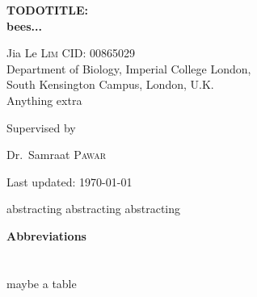 \documentclass[12pt]{article}
\renewenvironment{abstract}
 {\hspace{.8cm}
  {\bfseries\huge\abstractname}
  \list{}{
    \setlength{\leftmargin}{.95cm}%
    \setlength{\rightmargin}{\leftmargin}%
  }%
  \item\relax}
 {\endlist}
\begin{document}
\begin{titlepage}
	\centering
	\vspace*{\fill}
	{\huge\bfseries TODOTITLE: \\ bees...\par}
	\vspace{2cm}
	{\Large Jia Le \textsc{Lim} {    }  CID: 00865029}
	\\ 	\vspace{0.5cm}
	{Department of Biology, Imperial College London, \\South Kensington Campus, London, U.K.} \\ \vspace{0.5cm}
	{Anything extra} \\
	\vspace*{\fill}
	{\large Supervised by\par
	Dr.~Samraat \textsc{Pawar}}
	\vfill
	{\large Last updated: \today\par}
\end{titlepage}



\newpage
{}
\vspace*{\fill}
\begin{abstract}  
\doublespacing
abstracting abstracting abstracting

\end{abstract}
\vfill

\newpage
{}
\vspace*{\fill}
\tableofcontents 
\vspace*{\fill} 
\thispagestyle{empty}

\doublespacing

\newpage 
\vspace*{\fill}
{\huge\bfseries Abbreviations} \\
\\
\\
\large{maybe a table}
\vfill

\newpage
\pagestyle{fancy}
\fancyhf{}
\renewcommand{\headrulewidth}{0pt}
\end{document}
